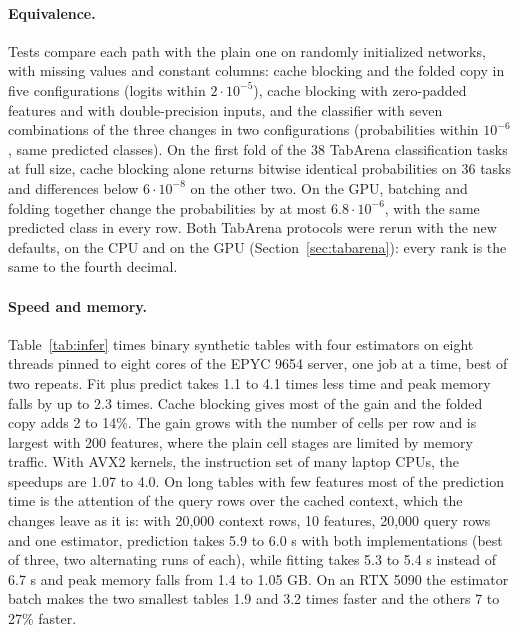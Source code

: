 \documentclass[11pt]{article}
\begin{document}
\paragraph{Equivalence.} Tests compare each path with the plain one on randomly initialized networks, with
missing values and constant columns: cache blocking and the folded copy in five configurations (logits within
$2\cdot10^{-5}$), cache blocking with zero-padded features and with double-precision inputs, and the classifier
with seven combinations of the three changes in two configurations (probabilities within $10^{-6}$, same predicted
classes).
On the first fold of the 38 TabArena classification tasks at full size, cache blocking alone returns bitwise
identical probabilities on 36 tasks and differences below $6\cdot10^{-8}$ on the other two. On the GPU, batching
and folding together change the probabilities by at most $6.8\cdot10^{-6}$, with the same predicted class in every
row. Both TabArena protocols were rerun with the new defaults, on the CPU and on the GPU
(Section~\ref{sec:tabarena}): every rank is the same to the fourth decimal.

\paragraph{Speed and memory.} Table~\ref{tab:infer} times binary synthetic tables with four estimators on eight
threads pinned to eight cores of the EPYC 9654 server, one job at a time, best of two repeats. Fit plus predict
takes 1.1 to 4.1 times less time and peak memory falls by up to 2.3 times. Cache blocking gives most of the gain
and the folded copy adds 2 to 14\%. The gain grows with the number of cells per row and is largest with 200
features, where the plain cell stages are limited by memory traffic. With AVX2 kernels, the instruction set of
many laptop CPUs, the speedups are 1.07 to 4.0. On long tables with few features most of the prediction time is
the attention of the query rows over the cached context, which the changes leave as it is: with 20,000 context
rows, 10 features, 20,000 query rows and one estimator, prediction takes 5.9 to 6.0 s with both implementations
(best of three, two alternating runs of each), while fitting takes 5.3 to 5.4 s instead of 6.7 s and peak memory
falls from 1.4 to 1.05 GB. On an RTX 5090 the estimator batch makes the two smallest tables 1.9 and 3.2 times
faster and the others 7 to 27\% faster.
\end{document}

